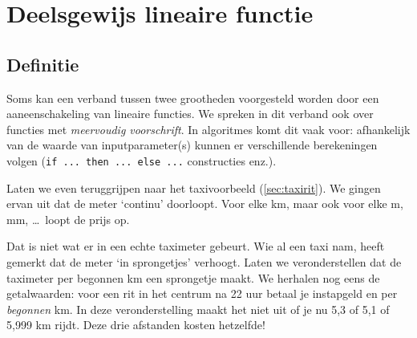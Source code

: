 \section{Deelsgewijs lineaire functie}\label{sec:taxisprong}
\subsection{Definitie}
Soms kan een verband tussen twee grootheden voorgesteld worden door een aaneenschakeling van lineaire functies. We spreken in dit verband ook over functies met \emph{meervoudig voorschrift}. In algoritmes komt dit vaak voor: afhankelijk van de waarde van inputparameter(s) kunnen er verschillende berekeningen volgen (\verb+if ... then ... else ...+ constructies enz.).

Laten we even teruggrijpen naar het taxivoorbeeld (\cref{sec:taxirit}). We gingen ervan uit dat de meter `continu' doorloopt. Voor elke km, maar ook voor elke m, mm, \ldots \ loopt de prijs op. 

Dat is niet wat er in een echte taximeter gebeurt. Wie al een taxi nam, heeft gemerkt dat de meter `in sprongetjes' verhoogt. Laten we veronderstellen dat de taximeter per begonnen km een sprongetje maakt. We herhalen nog eens de getalwaarden: voor een rit in het centrum na 22 uur betaal je  instapgeld en  per \emph{begonnen} km. In deze veronderstelling maakt het niet uit of je nu 5,3 of 5,1 of 5,999 km rijdt. Deze drie afstanden kosten hetzelfde!

